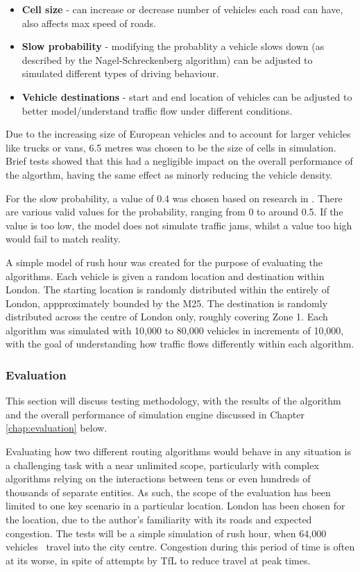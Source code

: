 \documentclass[ %
                    author={Alexander Hill},
                supervisor={Dr. Benjamin Sach},
                    degree={MEng},
                     title={MARMOSET},
                  subtitle={Multi-Agent Route Management using Online Simulation for Efficient Transportation},
                      type={research},
                      year={2016} ]{dissertation}
\begin{document}
\begin{itemize}
    \item \textbf{Cell size} - can increase or decrease number of vehicles each
        road can have, also affects max speed of roads.
    \item \textbf{Slow probability} - modifying the probablity a vehicle slows
        down (as described by the Nagel-Schreckenberg algorithm) can be adjusted
        to simulated different types of driving behaviour.
    \item \textbf{Vehicle destinations} - start and end location of vehicles can
        be adjusted to better model/understand traffic flow under different
        conditions.
\end{itemize}

Due to the increasing size of European vehicles and to account for
larger vehicles like trucks or vans, 6.5 metres was chosen to be the size of
cells in simulation. Brief tests showed that this had a negligible impact on
the overall performance of the algorthm, having the same effect as minorly
reducing the vehicle density.

For the slow probability, a value of 0.4 was chosen based on research in
\cite{nagel-detail}. There are various valid values for the probability, ranging
from 0 to around 0.5. If the value is too low, the model does not simulate
traffic jams, whilst a value too high would fail to match reality.

A simple model of rush hour was created for the purpose of evaluating the
algorithms. Each vehicle is given a random location and destination within
London. The starting location is randomly distributed within the entirely of
London, appproximately bounded by the M25. The destination is randomly
distributed across the centre of London only, roughly covering Zone 1. Each
algorithm was simulated with 10,000 to 80,000 vehicles in increments of 10,000,
with the goal of understanding how traffic flows differently within each
algorithm.

\subsubsection{Evaluation}

This section will discuss testing methodology, with the results of the algorithm
and the overall performance of simulation engine discussed in Chapter
\ref{chap:evaluation} below.

Evaluating how two different routing algorithms would behave in any situation is
a challenging task with a near unlimited scope, particularly with complex
algorithms relying on the interactions between tens or even hundreds of
thousands of separate entities. As such, the scope of the evaluation has been
limited to one key scenario in a particular location. London has been chosen for
the location, due to the author's familiarity with its roads and expected
congestion. The tests will be a simple simulation of rush hour, when 64,000
vehicles~\cite{tfl} travel into the city centre.  Congestion during this period
of time is often at its worse, in spite of attempts by TfL to reduce travel at
peak times.
\end{document}
